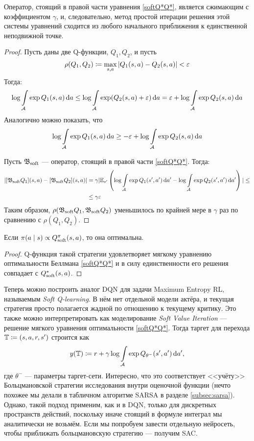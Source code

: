\begin{theorem}
Оператор, стоящий в правой части уравнения \eqref{softQ*Q*}, является сжимающим с коэффициентом $\gamma$, и, следовательно, метод простой итерации решения этой системы уравнений сходится из любого начального приближения к единственной неподвижной точке.
\begin{proof}
Пусть даны две Q-функции, $Q_1, Q_2$, и пусть 
$$\rho(Q_1, Q_2) \coloneqq \max\limits_{s, a} | Q_1(s, a) \HM- Q_2(s, a) | \HM< \eps$$
Тогда:
$$
\log \int\limits_{\mathcal{A}} \exp Q_1(s, a) \mathop{}\!\mathrm{d} a \le \log \int\limits_{\mathcal{A}} \exp (Q_2(s, a) + \varepsilon) \mathop{}\!\mathrm{d} a = \varepsilon + \log \int\limits_{\mathcal{A}} \exp Q_2(s, a) \mathop{}\!\mathrm{d} a
$$
Аналогично можно показать, что 
$$
\log \int\limits_{\mathcal{A}} \exp Q_1(s, a) \mathop{}\!\mathrm{d} a \ge -\varepsilon + \log \int\limits_{\mathcal{A}} \exp Q_2(s, a) \mathop{}\!\mathrm{d} a
$$

Пусть $\mathfrak{B}_{\mathrm{soft}}$ --- оператор, стоящий в правой части \eqref{softQ*Q*}. Тогда:
\begin{align*}
| [\mathfrak{B}_{\mathrm{soft}} Q_1](s, a) - [\mathfrak{B}_{\mathrm{soft}} Q_2](s, a) | &= \gamma | \mathbb{E}_{s'} \left( \log \int\limits_{\mathcal{A}} \exp Q_1(s', a') \mathop{}\!\mathrm{d} a' - \log \int\limits_{\mathcal{A}} \exp Q_2(s', a') \mathop{}\!\mathrm{d} a' \right) | \le \\ 
&\le \gamma \varepsilon
\end{align*}
Таким образом, $\rho(\mathfrak{B}_{\mathrm{soft}} Q_1, \mathfrak{B}_{\mathrm{soft}} Q_2)$ уменьшилось по крайней мере в $\gamma$ раз по сравнению с $\rho(Q_1, Q_2)$.
\end{proof}
\end{theorem}

\begin{proposition}
Если $\pi(a \mid s) \propto Q^{\pi}_{\mathrm{soft}}(s, a)$, то она оптимальна.
\begin{proof}
Q-функция такой стратегии удовлетворяет мягкому уравнению оптимальности Беллмана \eqref{softQ*Q*} и в силу единственности его решения совпадает с $Q^*_{\mathrm{soft}}(s, a)$.
\end{proof}
\end{proposition}

Теперь можно построить аналог DQN для задачи Maximum Entropy RL, называемым \emph{Soft Q-learning}. В нём нет отдельной модели актёра, и текущая стратегия просто полагается жадной по отношению к текущему критику. Это также можно интерпретировать как моделирование \emph{Soft Value Iteration} --- решение мягкого уравнения оптимальности \eqref{softQ*Q*}. Тогда таргет для перехода $\mathbb{T} \coloneqq (s, a, r, s')$ строится как
$$y(\mathbb{T}) \coloneqq r + \gamma \log \int\limits_{\mathcal{A}} \exp Q_{\theta^{-}}(s', a') \mathop{}\!\mathrm{d} a',$$
где $\theta^{-}$ --- параметры таргет-сети. Интересно, что это соответствует <<учёту>> Больцмановской стратегии исследования внутри оценочной функции (нечто похожее мы делали в табличном алгоритме SARSA в разделе \ref{subsec:sarsa}). Однако, такой подход применим, как и в DQN, только для дискретных пространств действий, поскольку иначе стоящий в формуле интеграл мы аналитически не возьмём. Если мы попробуем завести отдельную нейросеть, чтобы приближать больцмановскую стратегию --- получим SAC.

